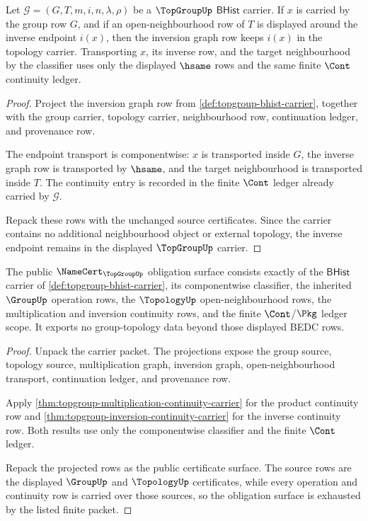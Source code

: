 \begin{theorem}
\label{thm:topgroup-inversion-continuity-carrier}
Let $\mathcal G=(G,T,m,i,n,\lambda,\rho)$ be a $\TopGroupUp$
$\mathsf{BHist}$ carrier. If $x$ is carried by the group row $G$, and if an
open-neighbourhood row of $T$ is displayed around the inverse endpoint
$i(x)$, then the inversion graph row keeps $i(x)$ in the topology carrier.
Transporting $x$, its inverse row, and the target neighbourhood by the
classifier uses only the displayed $\hsame$ rows and the same finite $\Cont$
continuity ledger.
\end{theorem}
\begin{proof}
Project the inversion graph row from
\autoref{def:topgroup-bhist-carrier}, together with the group carrier,
topology carrier, neighbourhood row, continuation ledger, and provenance row.

The endpoint transport is componentwise: $x$ is transported inside $G$, the
inverse graph row is transported by $\hsame$, and the target neighbourhood is
transported inside $T$. The continuity entry is recorded in the finite
$\Cont$ ledger already carried by $\mathcal G$.

Repack these rows with the unchanged source certificates. Since the carrier
contains no additional neighbourhood object or external topology, the inverse
endpoint remains in the displayed $\TopGroupUp$ carrier.
\end{proof}

\begin{theorem}
\label{thm:topgroup-namecert-obligation-surface}
The public $\NameCert_{\TopGroupUp}$ obligation surface consists exactly of
the $\mathsf{BHist}$ carrier of \autoref{def:topgroup-bhist-carrier}, its
componentwise classifier, the inherited $\GroupUp$ operation rows, the
$\TopologyUp$ open-neighbourhood rows, the multiplication and inversion
continuity rows, and the finite $\Cont$/$\Pkg$ ledger scope. It exports no
group-topology data beyond those displayed BEDC rows.
\end{theorem}
\begin{proof}
Unpack the carrier packet. The projections expose the group source, topology
source, multiplication graph, inversion graph, open-neighbourhood transport,
continuation ledger, and provenance row.

Apply \autoref{thm:topgroup-multiplication-continuity-carrier} for the
product continuity row and
\autoref{thm:topgroup-inversion-continuity-carrier} for the inverse
continuity row. Both results use only the componentwise classifier and the
finite $\Cont$ ledger.

Repack the projected rows as the public certificate surface. The source rows
are the displayed $\GroupUp$ and $\TopologyUp$ certificates, while every
operation and continuity row is carried over those sources, so the obligation
surface is exhausted by the listed finite packet.
\end{proof}

